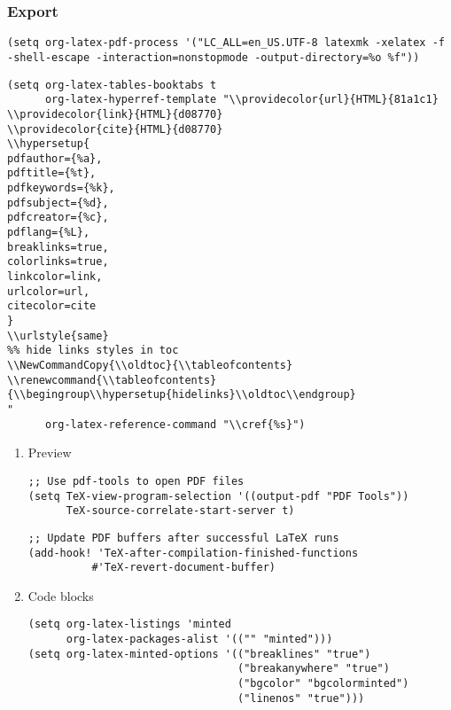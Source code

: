 \documentclass[c]{article}
\theoremstyle{plain}%
\theoremstyle{definition}
\theoremstyle{remark}
\renewcommand{\tableofcontents}{\begingroup\hypersetup{hidelinks}\oldtoc\endgroup}
\begin{document}
\subsubsection{Export}
\label{sec:org35d7ee9}
\begin{verbatim}
(setq org-latex-pdf-process '("LC_ALL=en_US.UTF-8 latexmk -xelatex -f  -shell-escape -interaction=nonstopmode -output-directory=%o %f"))
\end{verbatim}
\begin{verbatim}
(setq org-latex-tables-booktabs t
      org-latex-hyperref-template "\\providecolor{url}{HTML}{81a1c1}
\\providecolor{link}{HTML}{d08770}
\\providecolor{cite}{HTML}{d08770}
\\hypersetup{
pdfauthor={%a},
pdftitle={%t},
pdfkeywords={%k},
pdfsubject={%d},
pdfcreator={%c},
pdflang={%L},
breaklinks=true,
colorlinks=true,
linkcolor=link,
urlcolor=url,
citecolor=cite
}
\\urlstyle{same}
%% hide links styles in toc
\\NewCommandCopy{\\oldtoc}{\\tableofcontents}
\\renewcommand{\\tableofcontents}{\\begingroup\\hypersetup{hidelinks}\\oldtoc\\endgroup}
"
      org-latex-reference-command "\\cref{%s}")
\end{verbatim}
\begin{enumerate}
\item Preview
\label{sec:org4e7ffdc}
\begin{verbatim}
;; Use pdf-tools to open PDF files
(setq TeX-view-program-selection '((output-pdf "PDF Tools"))
      TeX-source-correlate-start-server t)
\end{verbatim}
\begin{verbatim}
;; Update PDF buffers after successful LaTeX runs
(add-hook! 'TeX-after-compilation-finished-functions
          #'TeX-revert-document-buffer)
\end{verbatim}
\item Code blocks
\label{sec:org14c3c23}
\begin{verbatim}
(setq org-latex-listings 'minted
      org-latex-packages-alist '(("" "minted")))
(setq org-latex-minted-options '(("breaklines" "true")
                                 ("breakanywhere" "true")
                                 ("bgcolor" "bgcolorminted")
                                 ("linenos" "true")))
\end{verbatim}
\end{enumerate}
\end{document}
